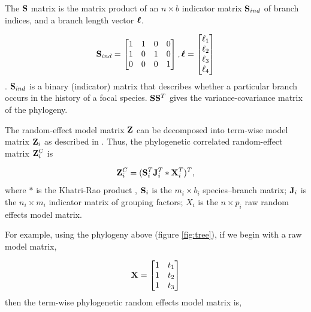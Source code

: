 \documentclass[12pt]{article}
\begin{document}
The ${\mathbf S}$ matrix is the matrix product of an $n \times b$ indicator matrix ${\mathbf S}_{ind}$ of branch indices, and a branch length vector ${\boldsymbol \ell}$.

\begin{align}
{\mathbf S}_{ind} = \begin{bmatrix}
1 & 1 & 0 & 0 \\ 
1 & 0 & 1 & 0 \\ 
0 & 0 & 0 & 1
\end{bmatrix} , 
{\boldsymbol \ell} = \begin{bmatrix}
\ell_1 \\
\ell_2 \\
\ell_3 \\
\ell_4 
\end{bmatrix}
\label{eq:S}
\end{align}.
${\mathbf S}_{ind}$ is a binary (indicator) matrix that describes whether a particular branch occurs in the history of a focal species. 
${\mathbf S} {\mathbf S}^T$ gives the variance-covariance matrix of the phylogeny. 

The random-effect model matrix ${\mathbf Z}$ can be decomposed into term-wise model matrix ${\mathbf Z}_{i}$ as described in \citet{bates2015fitting}.
Thus, the phylogenetic correlated random-effect matrix ${\mathbf Z}^{C}_{i}$ is

\begin{equation}
{\mathbf Z}^{C}_{i} = ({\mathbf S}^{T}_{i}{\mathbf J}^{T}_{i} \ast {\mathbf X}^{T}_{i})^{T}, \label{eq:ZC}
\end{equation}
where $\ast$ is the Khatri-Rao product \citep{khatri1968solutions}, ${\mathbf S}_{i}$ is the $m_{i} \times b_{i}$ species--branch matrix; ${\mathbf J}_{i}$ is the $n_i \times m_i$ indicator matrix of grouping factors; $X_{i}$ is the $n \times p_{i}$ raw random effects model matrix. 


For example, using the phylogeny above (figure \ref{fig:tree}), if we begin with a raw model matrix,

\begin{align}
{\mathbf X} = \begin{bmatrix}
1 & t_1  \\ 
1 & t_2  \\ 
1 & t_3 
\end{bmatrix} 
\end{align}
then the term-wise phylogenetic random effects model matrix is,
\end{document}
